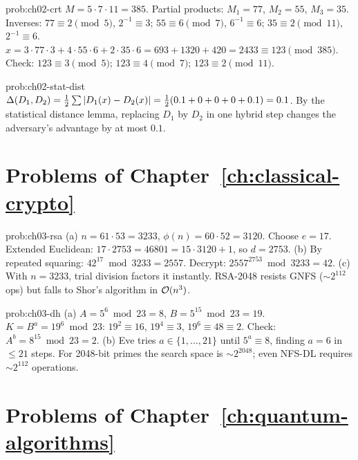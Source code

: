 \begin{sol}{prob:ch02-crt}
$M = 5\cdot7\cdot11 = 385$.  Partial products: $M_1=77$, $M_2=55$, $M_3=35$.
Inverses: $77\equiv 2\pmod5$, $2^{-1}\equiv 3$; \; $55\equiv 6\pmod7$, $6^{-1}\equiv 6$; \; $35\equiv 2\pmod{11}$, $2^{-1}\equiv 6$.
$x = 3\cdot77\cdot3 + 4\cdot55\cdot6 + 2\cdot35\cdot6 = 693+1320+420 = 2433 \equiv 123\pmod{385}$.
Check: $123\equiv 3\pmod5$\;\checkmark;\; $123\equiv 4\pmod7$\;\checkmark;\; $123\equiv 2\pmod{11}$\;\checkmark.
\end{sol}

\begin{sol}{prob:ch02-stat-dist}
$\Delta(D_1,D_2) = \tfrac{1}{2}\sum\left\lvert D_1(x)-D_2(x) \right\rvert = \tfrac{1}{2}(0.1+0+0+0+0.1) = 0.1$.
By the statistical distance lemma, replacing $D_1$ by $D_2$ in one hybrid step changes the adversary's advantage by at most $0.1$.
\end{sol}

\section*{Problems of Chapter~\ref{ch:classical-crypto}}

\begin{sol}{prob:ch03-rsa}
(a) $n=61\cdot53=3233$, $\phi(n)=60\cdot52=3120$.  Choose $e=17$.  Extended Euclidean: $17\cdot2753 = 46801 = 15\cdot3120+1$, so $d=2753$.
(b) By repeated squaring: $42^{17}\bmod 3233 = 2557$.  Decrypt: $2557^{2753}\bmod 3233 = 42$.\;\checkmark
(c) With $n=3233$, trial division factors it instantly.  RSA-2048 resists GNFS ($\sim\!2^{112}$ ops) but falls to Shor's algorithm in $\mathcal{O}(n^3)$.
\end{sol}

\begin{sol}{prob:ch03-dh}
(a) $A = 5^6\bmod 23 = 8$, $B = 5^{15}\bmod 23 = 19$.
$K = B^a = 19^6\bmod 23$: $19^2\equiv 16$, $19^4\equiv 3$, $19^6\equiv 48\equiv 2$.
Check: $A^b = 8^{15}\bmod 23 = 2$.\;\checkmark
(b) Eve tries $a\in\{1,\ldots,21\}$ until $5^a\equiv 8$, finding $a=6$ in $\leq 21$ steps.  For 2048-bit primes the search space is $\sim\!2^{2048}$; even NFS-DL requires $\sim\!2^{112}$ operations.
\end{sol}

\section*{Problems of Chapter~\ref{ch:quantum-algorithms}}

